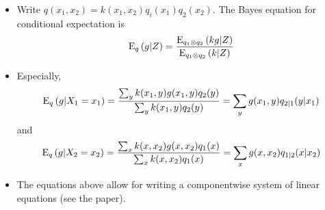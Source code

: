 \documentclass[xcolor=svgnames]{beamer}
\begin{document}
\begin{frame}
\begin{itemize}
\item Write $q(x_1,x_2) = k(x_1,x_2) q_i(x_1) q_2(x_2)$. The Bayes equation for conditional expectation is 
\begin{equation*}
    \operatorname{E}_{q}\left(g \middle| Z\right) = \frac{\operatorname{E}_{q_1 \otimes q_2}\left(kg \middle| Z\right)}{\operatorname{E}_{q_1 \otimes q_2}\left(k \middle| Z\right)}
\end{equation*}
\item Especially,
\begin{equation*}
   \operatorname{E}_{q}\left(g \middle| X_1=x_1\right) = \frac{\sum_y k(x_1,y)g(x_1,y) q_2(y)}{\sum_y k(x_1,y) q_2(y)} = \sum_y g(x_1,y) q_{2|1}(y|x_1)
\end{equation*}
and
\begin{equation*}
   \operatorname{E}_{q}\left(g \middle| X_2=x_2\right) = \frac{\sum_x k(x,x_2)g(x,x_2) q_1(x)}{\sum_x k(x,x_2) q_1(x)} = \sum_x g(x,x_2) q_{1|2}(x|x_2)
   \end{equation*}
   \item The equations above allow for writing a componentwise system of linear equations (see the paper).
   
        \end{itemize}


    \end{frame}
\end{document}
